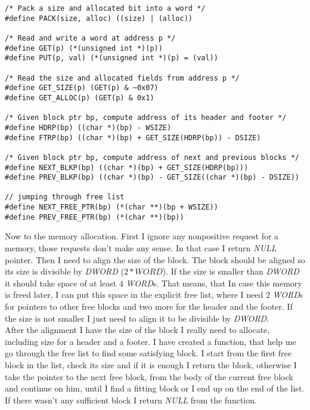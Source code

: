 \documentclass[a4paper]{article}
\begin{document}
\begin{lstlisting}[caption= Defined macros]
/* Pack a size and allocated bit into a word */
#define PACK(size, alloc) ((size) | (alloc))

/* Read and write a word at address p */
#define GET(p) (*(unsigned int *)(p))
#define PUT(p, val) (*(unsigned int *)(p) = (val))

/* Read the size and allocated fields from address p */
#define GET_SIZE(p) (GET(p) & ~0x07)
#define GET_ALLOC(p) (GET(p) & 0x1)

/* Given block ptr bp, compute address of its header and footer */
#define HDRP(bp) ((char *)(bp) - WSIZE)
#define FTRP(bp) ((char *)(bp) + GET_SIZE(HDRP(bp)) - DSIZE)

/* Given block ptr bp, compute address of next and previous blocks */
#define NEXT_BLKP(bp) ((char *)(bp) + GET_SIZE(HDRP(bp)))
#define PREV_BLKP(bp) ((char *)(bp) - GET_SIZE((char *)(bp) - DSIZE))

// jumping through free list
#define NEXT_FREE_PTR(bp) (*(char **)(bp + WSIZE))
#define PREV_FREE_PTR(bp) (*(char **)(bp))
\end{lstlisting}

Now to the memory allocation. First I ignore any nonpositive request for a memory, those
requests don't make any sense. In that case I return \textit{NULL} pointer. 
Then I need to align the size of the block. The block should be aligned so
its size is divisible by \textit{DWORD} ($2 * WORD$). 
If the size is smaller than \textit{DWORD} it should take space of at least 4 \textit{WORD}s. 
That means, that In case this memory is freed later, I can put this space in the explicit 
free list, where I need
2 \textit{WORD}s for pointers to other free blocks and two more for the header and the footer. 
If the size is not smaller I just need to align it to be divisible by \textit{DWORD}. \\
After the alignment I have the size of the block I really need to allocate, 
including size for a header and a footer.
I have created a function, that help me go through the free list to find some satisfying block. 
I start from 
the first free block in the list, check its size and
if it is enough I return the block, otherwise I take the pointer to the next free block, 
from the body of the current free block and continue on him, until I find a fitting block 
or I end up on the end of the list. If there wasn't any sufficient block I return \textit{NULL}
from the function. \\
\end{document}
